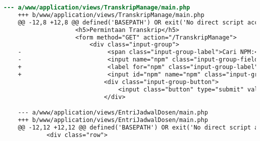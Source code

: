 \begin{lstlisting}[frame=single, label={lst:perbaikan_3.3.2_label_masukan}, language=diff, caption=Perbaikan Kriteria Sukses 3.3.2 - Tidak Terdapat Label pada Kolom Masukan]
    --- a/www/application/views/TranskripManage/main.php
    +++ b/www/application/views/TranskripManage/main.php
    @@ -12,8 +12,8 @@ defined('BASEPATH') OR exit('No direct script access allowed');
                    <h5>Permintaan Transkrip</h5>
                    <form method="GET" action="/TranskripManage">
                        <div class="input-group">
    -                        <span class="input-group-label">Cari NPM:</span>
    -                        <input name="npm" class="input-group-field" type="text" placeholder="2013730013" maxlength="10" minlength="10"<?= $npmQuery === NULL ? '' : " value='$npmQuery'" ?>/>
    +                        <label for="npm" class="input-group-label">Cari NPM:</label>
    +                        <input id="npm" name="npm" class="input-group-field" type="text" placeholder="2013730013" maxlength="10" minlength="10"<?= $npmQuery === NULL ? '' : " value='$npmQuery'" ?>/>
                            <div class="input-group-button">
                                <input class="button" type="submit" value="Cari"/>
                            </div>

    --- a/www/application/views/EntriJadwalDosen/main.php
    +++ b/www/application/views/EntriJadwalDosen/main.php
    @@ -12,12 +12,12 @@ defined('BASEPATH') OR exit('No direct script access allowed');
            <div class="row">
    

\end{lstlisting}
